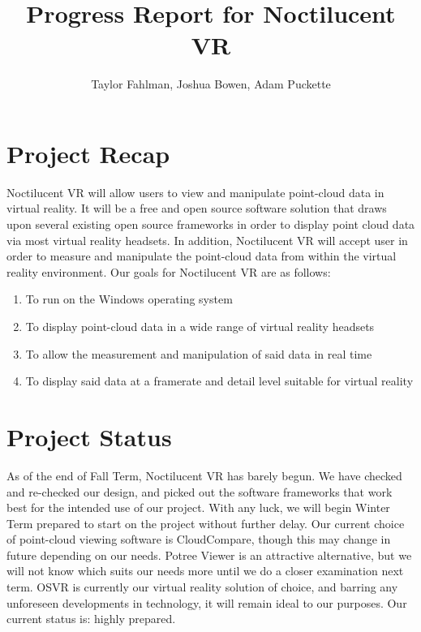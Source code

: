 \documentclass{article}
\begin{document}
\title {Progress Report for Noctilucent VR}
\author {Taylor Fahlman, Joshua Bowen, Adam Puckette}

\maketitle

\section{Project Recap}

Noctilucent VR will allow users to view and manipulate point-cloud data in virtual reality. 
It will be a free and open source software solution that draws upon several existing open source frameworks in order to display point cloud data via most virtual reality headsets. 
In addition, Noctilucent VR will accept user in order to measure and manipulate the point-cloud data from within the virtual reality environment. 
Our goals for Noctilucent VR are as follows:

\begin{enumerate}
\item To run on the Windows operating system
\item To display point-cloud data in a wide range of virtual reality headsets
\item To allow the measurement and manipulation of said data in real time
\item To display said data at a framerate and detail level suitable for virtual reality
\end{enumerate}

\section{Project Status}

As of the end of Fall Term, Noctilucent VR has barely begun. 
We have checked and re-checked our design, and picked out the software frameworks that work best for the intended use of our project. 
With any luck, we will begin Winter Term prepared to start on the project without further delay. 
Our current choice of point-cloud viewing software is CloudCompare, though this may change in future depending on our needs. 
Potree Viewer is an attractive alternative, but we will not know which suits our needs more until we do a closer examination next term. 
OSVR is currently our virtual reality solution of choice, and barring any unforeseen developments in technology, it will remain ideal to our purposes. 
Our current status is: highly prepared.
\end{document}
